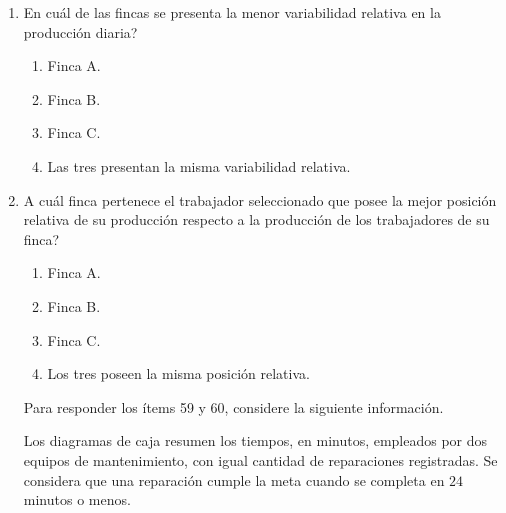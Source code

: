 \documentclass[12pt]{article}
\begin{document}
\begin{enumerate}[label=\textbf{\arabic*.}, start=29, itemsep=1cm]
\item
\textquestiondown En cu\'al de las fincas se presenta la menor variabilidad relativa en la producci\'on diaria?

\begin{enumerate}[label=\Alph*)]
  \item Finca A.
  \item Finca B.
  \item Finca C.
  \item Las tres presentan la misma variabilidad relativa.
\end{enumerate}

\item
\textquestiondown A cu\'al finca pertenece el trabajador seleccionado que posee la mejor posici\'on relativa de su producci\'on respecto a la producci\'on de los trabajadores de su finca?

\begin{enumerate}[label=\Alph*)]
  \item Finca A.
  \item Finca B.
  \item Finca C.
  \item Los tres poseen la misma posici\'on relativa.
\end{enumerate}

\Needspace{0.96\textheight}
\noindent Para responder los \'items 59 y 60, considere la siguiente informaci\'on.

Los diagramas de caja resumen los tiempos, en minutos, empleados por dos equipos de mantenimiento, con igual cantidad de reparaciones registradas. Se considera que una reparaci\'on cumple la meta cuando se completa en $24$ minutos o menos.

\begin{center}
\end{center}
\end{enumerate}
\end{document}
